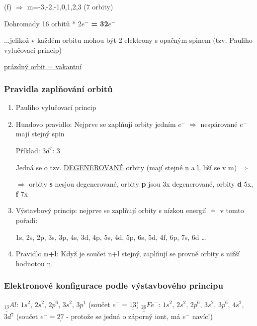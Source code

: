     (f) $\Rightarrow$ m=-3,-2,-1,0,1,2,3 (7 orbity)

\medskip
Dohromady 16 orbitů * 2$e^-$ \textbf{= 32$e^-$}

...jelikož v každém orbitu mohou být 2 elektrony s opačným spinem (tzv. Pauliho vylučovací princip)

\bigskip
\fbox{\;\;} \underline{prázdný orbit = vakantní}

\subsubsection{Pravidla zaplňování orbitů}
\begin{enumerate}
    \item Pauliho vylučovací princip
    \item Hundovo pravidlo: Nejprve se zaplňují orbity jedním $e^- \; \Rightarrow$ nespárované $e^-$ mají stejný spin
    
    Příklad: $3d^7$: 3 \fbox{$\downarrow\textcolor{magenta}{\uparrow}$}\fbox{$\downarrow\textcolor{magenta}{\uparrow}$}\fbox{$\downarrow\textcolor{magenta}{.}$}\fbox{$\downarrow\textcolor{magenta}{.}$}\fbox{$\downarrow\textcolor{magenta}{.}$}
    
    Jedná se o tzv. \underline{DEGENEROVANÉ} orbity (mají stejné \underline{n} a \underline{l}, liší se v m) $\Rightarrow$
    
    $\Rightarrow$ orbity \textbf{s} nesjou degenerované, orbity \textbf{p} jsou 3x degenerované, orbity \textbf{d} 5x, \textbf{f} 7x
    \item Výstavbový princip: nejprve se zaplňují orbity s nízkou energií $\doteq$ v tomto pořadí:
    
    1s, 2s, 2p, 3s, 3p, 4s, 3d, 4p, 5s, 4d, 5p, 6s, 5d, 4f, 6p, 7s, 6d \dots
    \item Pravidlo \textbf{n+l}: Když je součet n+l stejný, zaplňují se provně orbity s nižší hodnotou \underline{n}.
\end{enumerate}

\subsubsection{\hypertarget{vystavbovyprincip}{Elektronové konfigurace podle výstavbového principu}}
$\underline{\underline{_{13}}}Al$: $1s^2$, $2s^2$, $2p^6$, $3s^2$, $3p^1$ (součet $e^- = \underline{\underline{13}}$)
$\underline{\underline{_{26}}}Fe^-$: $1s^2$, $2s^2$, $2p^6$, $3s^2$, $3p^6$, $4s^2$, $3d^{\underline{7}}$ (součet $e^- = \underline{\underline{27}}$ - protože se jedná o záporný iont, má $e^-$ navíc!)

